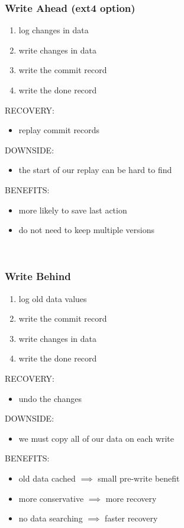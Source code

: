 \documentclass[../../lecture_notes.tex]{subfiles}
\begin{document}
\begin{figure}[H]
\begin{subfigure}[t]{0.5\linewidth}
\subsubsection*{Write Ahead (ext4 option)}
\begin{enumerate}[nosep]
\item log changes in data
\item write changes in data
\item write the commit record
\item write the done record
\end{enumerate}
RECOVERY:
\begin{itemize}
\item replay commit records
\end{itemize}
DOWNSIDE:
\begin{itemize}
\item the start of our replay can be hard to find
\end{itemize}
BENEFITS:
\begin{itemize}
\item more likely to save last action
\item do not need to keep multiple versions
\end{itemize}
\end{subfigure}
~
\begin{subfigure}[t]{0.5\linewidth}
\subsubsection*{Write Behind}
\begin{enumerate}[nosep]
\item log old data values
\item write the commit record
\item write changes in data
\item write the done record
\end{enumerate}
RECOVERY:
\begin{itemize}
\item undo the changes
\end{itemize}
DOWNSIDE:
\begin{itemize}
\item we must copy all of our data on each write
\end{itemize}
BENEFITS:
\begin{itemize}
\item old data cached $\implies$ small pre-write benefit
\item more conservative $\implies$ more recovery
\item no data searching $\implies$ faster recovery
\end{itemize}
\end{subfigure}
\end{figure}
\end{document}
